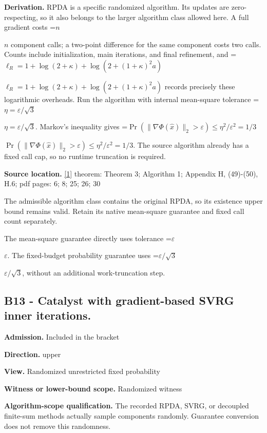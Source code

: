 \documentclass[10pt,a4paper]{article}
\newcommand{\AtlasMath}[1]{\par\begingroup\centering\setbox0=\hbox{$\displaystyle #1$}\ifdim\wd0>1.4\linewidth\typeout{ATLAS WIDE FORMULA: \the\wd0}\fi\ifdim\wd0>\linewidth\resizebox{\linewidth}{!}{\box0}\else\box0\fi\par\endgroup}
\newcommand{\AtlasInlineMath}[1]{\begingroup\setbox0=\hbox{$#1$}\ifdim\wd0>.4\linewidth\endgroup\AtlasMath{#1}\else\endgroup$#1$\fi}
\begin{document}
\textbf{Derivation.} RPDA is a specific randomized algorithm. Its updates are zero-respecting, so it also belongs to the larger algorithm class allowed here. A full gradient costs \AtlasInlineMath{n} component calls; a two-point difference for the same component costs two calls. Counts include initialization, main iterations, and final refinement, and \AtlasInlineMath{\ell_R=1+\log(2+\kappa)+\log(2+(1+\kappa)^2a)} records precisely these logarithmic overheads. Run the algorithm with internal mean-square tolerance \AtlasInlineMath{\eta=\varepsilon/\sqrt3}. Markov's inequality gives \AtlasInlineMath{\Pr(\|\nabla\Phi(\widehat x)\|_2>\varepsilon)\le\eta^2/\varepsilon^2=1/3}. The source algorithm already has a fixed call cap, so no runtime truncation is required.



\textbf{Source location.} \href{https://arxiv.org/pdf/2610.04944v1}{[1]} theorem: Theorem 3; Algorithm 1; Appendix H, (49)-(50), H.6; pdf pages: 6; 8; 25; 26; 30



The admissible algorithm class contains the original RPDA, so its existence upper bound remains valid. Retain its native mean-square guarantee and fixed call count separately.



The mean-square guarantee directly uses tolerance \AtlasInlineMath{\varepsilon}. The fixed-budget probability guarantee uses \AtlasInlineMath{\varepsilon/\sqrt3}, without an additional work-truncation step.



\subsection{B13 - Catalyst with gradient-based SVRG inner iterations.}


\textbf{Admission.} Included in the bracket



\textbf{Direction.} upper



\textbf{View.} Randomized unrestricted fixed probability



\textbf{Witness or lower-bound scope.} Randomized witness



\textbf{Algorithm-scope qualification.} The recorded RPDA, SVRG, or decoupled finite-sum methods actually sample components randomly. Guarantee conversion does not remove this randomness.
\end{document}
